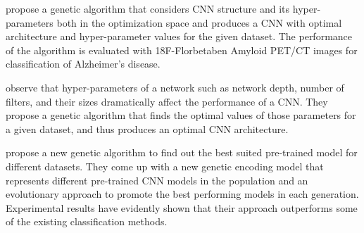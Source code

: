 \documentclass[a4paper,fleqn]{cas-sc}
\begin{document}
\citet{LeeKim2021} propose a genetic algorithm that considers CNN structure and its hyper-parameters both in the optimization space and produces a CNN with optimal architecture and hyper-parameter values for the given dataset. The performance of the algorithm is evaluated with  18F-Florbetaben Amyloid PET/CT images for classification of Alzheimer's disease. %

\citet{Loussaief2018} observe that hyper-parameters of a network such as network depth, number of filters, and their sizes dramatically affect the performance of a CNN. They propose a genetic algorithm that  finds the optimal values of those parameters for a given dataset, and thus produces an optimal CNN architecture. %

\citet{TianChen2018} propose a new genetic algorithm to find out the best suited pre-trained model for different datasets. They come up with a new genetic encoding model that represents different pre-trained CNN models in the population and an evolutionary approach to promote the best performing models in each generation. Experimental results have evidently shown that their approach outperforms some of the existing classification methods. %
\end{document}
